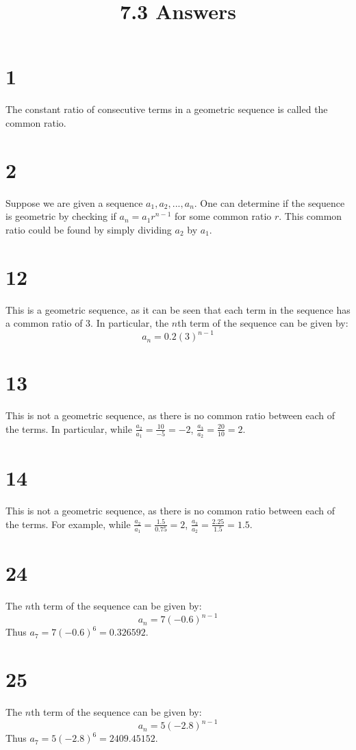 \documentclass{article}
\title{7.3 Answers}
\theoremstyle{definition}
\newcommand{\?}{\stackrel{?}{=}}
\begin{document}
\maketitle

\section*{1}
The constant ratio of consecutive terms in a geometric sequence is called the common ratio.

\section*{2}
Suppose we are given a sequence $a_1,a_2,...,a_n$. One can determine if the sequence is geometric by checking if $a_n=a_1r^{n-1}$ for some common ratio $r$. This common ratio could be found 
by simply dividing $a_2$ by $a_1$.

\section*{12}
This is a geometric sequence, as it can be seen that each term in the sequence has a common ratio of $3$. In particular, the $n$th term of the sequence can be given by:
\[ a_n=0.2(3)^{n-1} \]

\section*{13}
This is not a geometric sequence, as there is no common ratio between each of the terms. In particular, while $\frac{a_2}{a_1}=\frac{10}{-5}=-2$, 
$\frac{a_3}{a_2}=\frac{20}{10}=2$.

\section*{14}
This is not a geometric sequence, as there is no common ratio between each of the terms. For example, while $\frac{a_2}{a_1}=\frac{1.5}{0.75}=2$,
$\frac{a_3}{a_2}=\frac{2.25}{1.5}=1.5$.

\section*{24}
The $n$th term of the sequence can be given by:
\[ a_n=7(-0.6)^{n-1} \]
Thus $a_7=7(-0.6)^6=0.326592$.

\section*{25}
The $n$th term of the sequence can be given by:
\[ a_n=5(-2.8)^{n-1} \]
Thus $a_7=5(-2.8)^6=2409.45152$.
\end{document}
